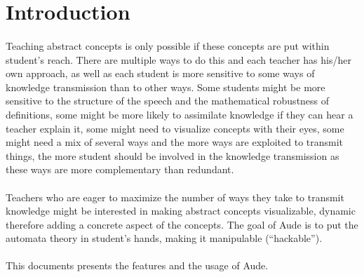 \section{Introduction}

\paragraph{}
Teaching abstract concepts is only possible if these concepts are put within student's reach. There are multiple ways to do this and each teacher has his/her own approach, as well as each student is more sensitive to some ways of knowledge transmission than to other ways. Some students might be more sensitive to the structure of the speech and the mathematical robustness of definitions, some might be more likely to assimilate knowledge if they can hear a teacher explain it, some might need to visualize concepts with their eyes, some might need a mix of several ways and the more ways are exploited to transmit things, the more student should be involved in the knowledge transmission as these ways are more complementary than redundant.


\paragraph{}
Teachers who are eager to maximize the number of ways they take to transmit knowledge might be interested in making abstract concepts visualizable, dynamic therefore adding a concrete aspect of the concepts. The goal of Aude is to put the automata theory in student's hands, making it manipulable (``hackable'').

\paragraph{}
This documents presents the features and the usage of Aude.
